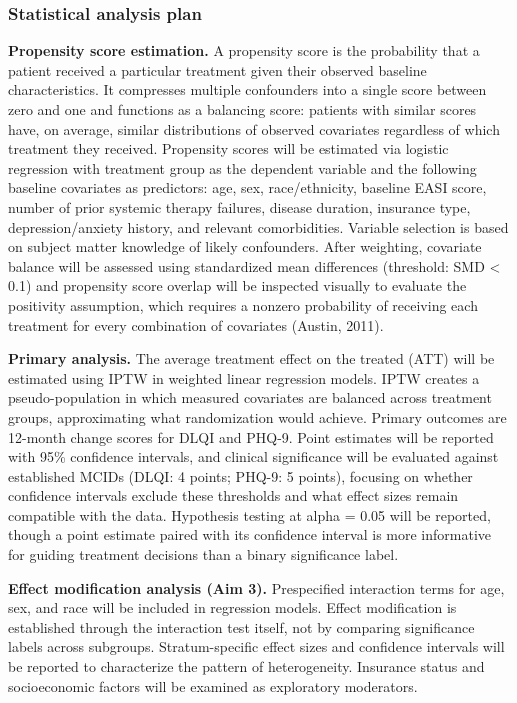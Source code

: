 \documentclass[
]{agujournal2019}
\begin{document}
\subsubsection{Statistical analysis
plan}\label{statistical-analysis-plan}

\textbf{Propensity score estimation.} A propensity score is the
probability that a patient received a particular treatment given their
observed baseline characteristics. It compresses multiple confounders
into a single score between zero and one and functions as a balancing
score: patients with similar scores have, on average, similar
distributions of observed covariates regardless of which treatment they
received. Propensity scores will be estimated via logistic regression
with treatment group as the dependent variable and the following
baseline covariates as predictors: age, sex, race/ethnicity, baseline
EASI score, number of prior systemic therapy failures, disease duration,
insurance type, depression/anxiety history, and relevant comorbidities.
Variable selection is based on subject matter knowledge of likely
confounders. After weighting, covariate balance will be assessed using
standardized mean differences (threshold: SMD \textless{} 0.1) and
propensity score overlap will be inspected visually to evaluate the
positivity assumption, which requires a nonzero probability of receiving
each treatment for every combination of covariates (Austin, 2011).

\textbf{Primary analysis.} The average treatment effect on the treated
(ATT) will be estimated using IPTW in weighted linear regression models.
IPTW creates a pseudo-population in which measured covariates are
balanced across treatment groups, approximating what randomization would
achieve. Primary outcomes are 12-month change scores for DLQI and PHQ-9.
Point estimates will be reported with 95\% confidence intervals, and
clinical significance will be evaluated against established MCIDs (DLQI:
4 points; PHQ-9: 5 points), focusing on whether confidence intervals
exclude these thresholds and what effect sizes remain compatible with
the data. Hypothesis testing at alpha = 0.05 will be reported, though a
point estimate paired with its confidence interval is more informative
for guiding treatment decisions than a binary significance label.

\textbf{Effect modification analysis (Aim 3).} Prespecified interaction
terms for age, sex, and race will be included in regression models.
Effect modification is established through the interaction test itself,
not by comparing significance labels across subgroups. Stratum-specific
effect sizes and confidence intervals will be reported to characterize
the pattern of heterogeneity. Insurance status and socioeconomic factors
will be examined as exploratory moderators.
\end{document}
